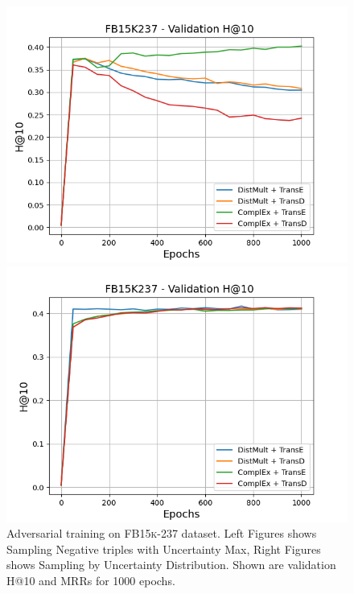 \begin{figure}
\begin{minipage}{.5\textwidth}
    \end{minipage}
    \begin{minipage}{.5\textwidth}
      \centering
      \includegraphics[width=0.9\linewidth]{figures/results/gan_train/not_pretrained/uncertainty/max/entropy/fb15k237/uncertainty_fb15k237_hit10.png}
    \end{minipage}%
    \begin{minipage}{.5\textwidth}
      \centering
      \includegraphics[width=0.9\linewidth]{figures/results/gan_train/not_pretrained/uncertainty/max_distribution/entropy/fb15k237/uncertainty_fb15k237_hit10.png}
    \end{minipage}%
    \caption{Adversarial training on \textsc{FB15k-237} dataset. 
    Left Figures shows Sampling Negative triples with Uncertainty Max, Right Figures shows Sampling by Uncertainty Distribution.
    Shown are validation H@10 and MRRs for 1000 epochs.}
    \label{fig:advtrain_fb15k237_usmax_ussoftmax}
\end{figure}
